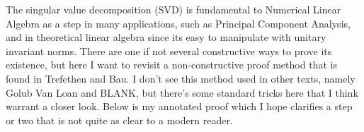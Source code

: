 \documentclass[11pt,reqno]{amsart}
\begin{document}
The singular value decomposition (SVD) is fundamental to Numerical Linear Algebra as a step in many applications, such as Principal Component Analysis, and in theoretical linear algebra since its easy to manipulate with unitary invariant norms. 
There are one if not several constructive ways to prove its existence, but here I want to revisit a non-constructive proof method that is found in Trefethen and Bau.
I don't see this method used in other texts, namely Golub Van Loan and BLANK, but there's some standard tricks here that I think warrant a closer look.
Below is my annotated proof which I hope clarifies a step or two that is not quite as clear to a modern reader. 
\end{document}
